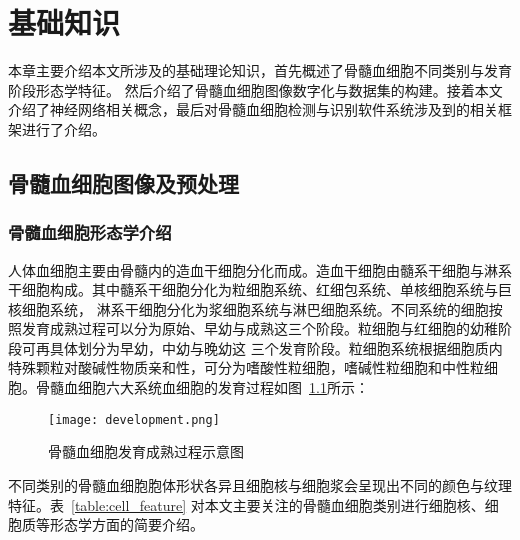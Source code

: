 
\chapter{基础知识}
本章主要介绍本文所涉及的基础理论知识，首先概述了骨髓血细胞不同类别与发育阶段形态学特征。
然后介绍了骨髓血细胞图像数字化与数据集的构建。接着本文介绍了神经网络相关概念，最后对骨髓血细胞检测与识别软件系统涉及到的相关框架进行了介绍。
\section{骨髓血细胞图像及预处理}
\subsection{骨髓血细胞形态学介绍}
人体血细胞主要由骨髓内的造血干细胞分化而成。造血干细胞由髓系干细胞与淋系干细胞构成。其中髓系干细胞分化为粒细胞系统、红细包系统、单核细胞系统与巨核细胞系统，
淋系干细胞分化为浆细胞系统与淋巴细胞系统。不同系统的细胞按照发育成熟过程可以分为原始、早幼与成熟这三个阶段。粒细胞与红细胞的幼稚阶段可再具体划分为早幼，中幼与晚幼这
三个发育阶段。粒细胞系统根据细胞质内特殊颗粒对酸碱性物质亲和性，可分为嗜酸性粒细胞，嗜碱性粒细胞和中性粒细胞。骨髓血细胞六大系统血细胞的发育过程如图~\ref{fig:development}所示\cite{cong2002}：
\begin{figure}[htbp]
  \centering
  \texttt{[image: development.png]}
  \caption{骨髓血细胞发育成熟过程示意图}
  \label{fig:development}
\end{figure}

不同类别的骨髓血细胞胞体形状各异且细胞核与细胞浆会呈现出不同的颜色与纹理特征。表~\ref{table:cell_feature}
对本文主要关注的骨髓血细胞类别进行细胞核、细胞质等形态学方面的简要介绍。

